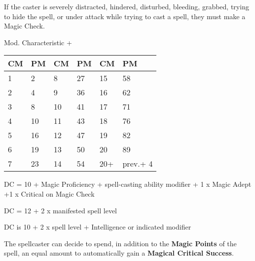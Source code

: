 \documentclass[landscape,10pt,a4paper]{article}
\begin{document}
\begin{multicols}{2}
\begin{dmbox}[title=Distracted - page \pageref{magiedistratto}]
If the caster is severely distracted, hindered, disturbed, bleeding, grabbed, trying to hide the spell, or under attack while trying to cast a spell, they must make a Magic Check.
\end{dmbox}


\begin{dmbox}[title=Magic Points - page \pageref{magiepuntimagia}]

Mod. Characteristic + \\

\noindent\begin{tabularx}{0.45\textwidth}{XX|XX|XX}
\textbf{CM} & \textbf{PM}&\textbf{CM} & \textbf{PM}&\textbf{CM} & \textbf{PM}\\
\hline
1&2 &8&27&15&58\\
2&4&9&36&16&62\\
3&8&10&41&17&71\\
4&10&11&43&18&76\\
5&16&12&47&19&82\\
6&19&13&50&20&89\\
7&23&14&54&20+&prev.+ 4
\end{tabularx}

\end{dmbox}


\begin{dmbox}[title=Spell Saving Throw - page \pageref{magiesavingthrows}]
DC = 10 + Magic Proficiency + spell-casting ability modifier + 1 x Magic Adept +1 x Critical on Magic Check
\end{dmbox}


\begin{dmbox}[title=Saving Throw for Magic from Objects - page \pageref{saving throws from items}]
DC = 12 + 2 x manifested spell level
\end{dmbox}

\begin{dmbox}[title=Monster Spell Saving Throw - page \pageref{tirosalvezzainccmostro}]
DC is 10 + 2 x spell level + Intelligence or indicated modifier
\end{dmbox}

\begin{dmbox}[title=Auto Magical Critical Success - page \pageref{magienova}]
The spellcaster can decide to spend, in addition to the \textbf{Magic Points} of the spell, an equal amount to automatically gain a \textbf{Magical Critical Success}.


\end{dmbox}
\end{multicols}
\end{document}
